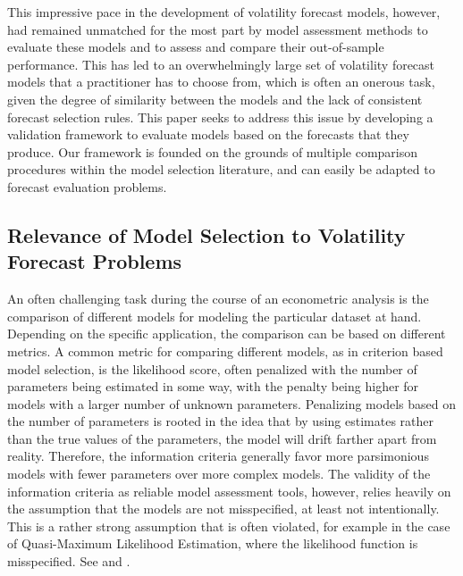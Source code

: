 \documentclass{article} %
\begin{document}
	This impressive pace in the development of volatility forecast models, however, had remained unmatched for the most part by model assessment methods to evaluate these models and to assess and compare their out-of-sample performance. This has led to an overwhelmingly large set of volatility forecast models that a practitioner has to choose from, which is often an onerous task, given the degree of similarity between the models and the lack of consistent forecast selection rules. This paper seeks to address this issue by developing a validation framework to evaluate models based on the forecasts that they produce. Our framework is founded on the grounds of multiple comparison procedures within the model selection literature, and can easily be adapted to forecast evaluation problems.
	
	\subsection{Relevance of Model Selection to Volatility Forecast Problems}
	 An often challenging task during the course of an econometric analysis is the comparison of different models for modeling the particular dataset at hand. Depending on the specific application, the comparison can be based on different metrics. A common metric for comparing different models, as in criterion based model selection, is the likelihood score, often penalized with the number of parameters being estimated in some way, with the penalty being higher for models with a larger number of unknown parameters. Penalizing models based on the number of parameters is rooted in the idea that by using estimates rather than the true values of the parameters, the model will drift farther apart from reality. Therefore, the information criteria generally favor more parsimonious models with fewer parameters over more complex models. The validity of the information criteria as reliable model assessment tools, however, relies heavily on the assumption that the models are not misspecified, at least not intentionally. This is a rather strong assumption that is often violated, for example in the case of Quasi-Maximum Likelihood Estimation, where the likelihood function is misspecified. See \textcite{BOLLERSLEV19942959} and \textcite{SIN1996207}. 
	 
\end{document}
